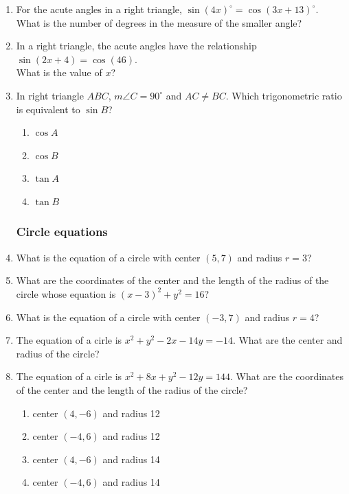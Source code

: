 \documentclass[12pt, oneside]{article}
\begin{document}
\begin{enumerate}[itemsep=0cm]
\item For the acute angles in a right triangle, $\sin (4x)^\circ =\cos (3x +13)^\circ$. \\
What is the number of degrees in the measure of the smaller angle?

\item In a right triangle, the acute angles have the relationship \\$\sin (2x + 4)=\cos (46)$.\\[0.25cm]
What is the value of $x$?

\item In right triangle $ABC$, $m\angle C=90^\circ$ and $AC \ne BC$. Which trigonometric ratio is equivalent to $\sin B$?
\begin{multicols}{2}
  \begin{enumerate}
    \item $\cos A$
    \item $\cos B$
    \item $\tan A$
    \item $\tan B$
  \end{enumerate}
\end{multicols}

\newpage
\subsubsection*{Circle equations}
\item What is the equation of a circle with center $(5,7)$ and radius $r=3$? 

\item What are the coordinates of the center and the length of the radius of the circle whose equation is $(x-3)^2+y^2=16$?

\item What is the equation of a circle with center $(-3,7)$ and radius $r=4$?

\item The equation of a cirle is $x^2+y^2-2x-14y=-14$. What are the center and radius of the circle?
  
\item The equation of a cirle is $x^2+8x+y^2-12y=144$. What are the coordinates of the center and the length of the radius of the circle?
    \begin{enumerate}
      \item center $(4,-6)$ and radius 12
      \item center $(-4,6)$ and radius 12
      \item center $(4,-6)$ and radius 14
      \item center $(-4,6)$ and radius 14
    \end{enumerate}


\end{enumerate}
\end{document}
